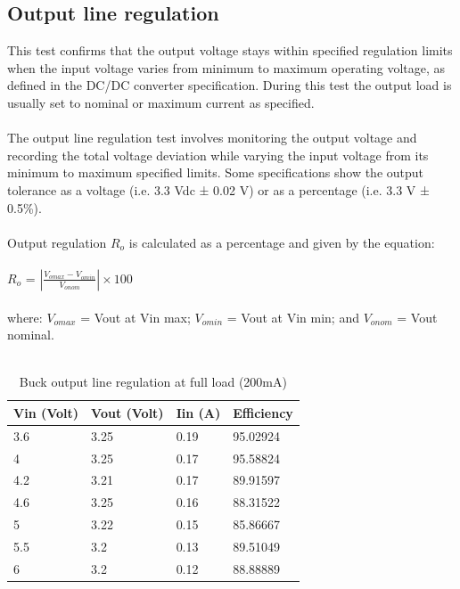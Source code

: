 \subsection{Output line regulation}

This test confirms that the output voltage stays within specified regulation limits when the input voltage varies from minimum to maximum operating voltage, as defined in the DC/DC converter specification. During this test the output load is usually set to nominal or maximum current as specified.
\\ \\
The output line regulation test involves monitoring the output voltage and recording the total voltage deviation while varying the input voltage from its minimum to maximum specified limits. Some specifications show the output tolerance as a voltage (i.e. 3.3 Vdc ± 0.02 V) or as a percentage (i.e. 3.3 V ± 0.5\%).
\\ \\
Output regulation $R_{o}$ is calculated as a percentage and given by the equation:
\\ \\
\hspace*{5cm}$R_{o}$ = $\left | \frac{V_{omax}-V_{omin}}{V_{onom}} \right | \times 100$
\\ \\
where:
$V_{omax}$ = Vout at Vin max; 
$V_{omin}$ = Vout at Vin min; and
$V_{onom}$ = Vout nominal.
\\ \\
\begin{table}[H]
\centering
\begin{tabular}{|l|l|l|l|}
\hline
Vin (Volt) & Vout (Volt) & Iin (A) & Efficiency \\ \hline
3.6        & 3.25        & 0.19    & 95.02924   \\ \hline
4          & 3.25        & 0.17    & 95.58824   \\ \hline
4.2        & 3.21        & 0.17    & 89.91597   \\ \hline
4.6        & 3.25        & 0.16    & 88.31522   \\ \hline
5          & 3.22        & 0.15    & 85.86667   \\ \hline
5.5        & 3.2         & 0.13    & 89.51049   \\ \hline
6          & 3.2         & 0.12    & 88.88889   \\ \hline
\end{tabular}
\caption{Buck output line regulation at full load (200mA)}
\label{table:4}
\end{table}
\\

